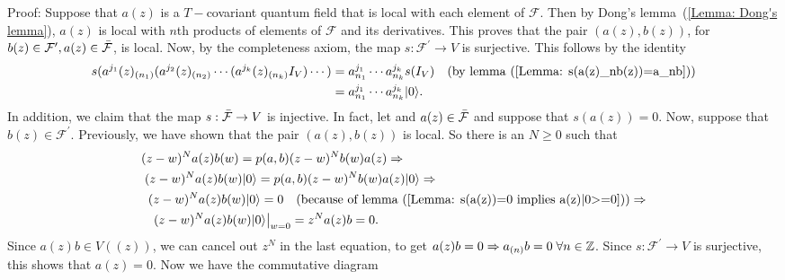 Proof: Suppose that $a(z)$ is a $T-$covariant quantum field that is local with each element of $\mathcal{F}$. Then by Dong's lemma~(\ref{Lemma: Dong's lemma}), $a(z)$ is local with $n$th products of elements of $\mathcal{F}$ and its derivatives. This proves that the pair $(a(z),b(z))$, for $b(z)\in\mathcal{F}^\prime,a(z)\in\Bar{\mathcal{F}}$, is local. Now, by the completeness axiom, the map $s:\mathcal{F}^\prime\rightarrow V$ is surjective. This follows by the identity
\begin{equation}
    \begin{split}
        s(a^{j_1}(z)_{(n_1)}(a^{j_2}(z)_{(n_2)}\cdots (a^{j_k}(z)_{(n_k)}I_V)\cdots) &= a_{n_1}^{j_1}\cdots a_{n_k}^{j_k}s(I_V)\quad(\text{by lemma~(\ref{Lemma: s(a(z)_nb(z))=a_nb})})\\
        &=a_{n_1}^{j_1}\cdots a_{n_k}^{j_k}|0\rangle.
    \end{split}
\end{equation}
In addition, we claim that the map $s:\Bar{\mathcal{F}}\rightarrow V$ is injective. In fact, let and $a(z)\in\Bar{\mathcal{F}}$ and suppose that $s(a(z))=0$. Now, suppose that $b(z)\in\mathcal{F}^\prime$. Previously, we have shown that the pair $(a(z),b(z))$ is local. So there is an $N\geq0$ such that
\begin{equation}
\begin{split}
     &(z-w)^Na(z)b(w)=p(a,b)(z-w)^Nb(w)a(z)\Rightarrow\\
     &\;(z-w)^Na(z)b(w)|0\rangle=p(a,b)(z-w)^Nb(w)a(z)|0\rangle\Rightarrow\\
     &\;\;(z-w)^Na(z)b(w)|0\rangle=0\quad(\text{because of lemma~(\ref{Lemma: s(a(z))=0 implies a(z)|0>=0})})\Rightarrow\\
     &\quad (z-w)^Na(z)b(w)|0\rangle\big|_{w=0}= z^Na(z)b=0.
\end{split}
\end{equation}
Since $a(z)b\in V((z))$, we can cancel out $z^N$ in the last equation, to get $a(z)b=0\Rightarrow a_{(n)}b=0\;\forall n\in\mathbb{Z}$. Since $s:\mathcal{F}^\prime\rightarrow V$ is surjective, this shows that $a(z)=0$. Now we have the commutative diagram
\begin{center}
\end{center}
